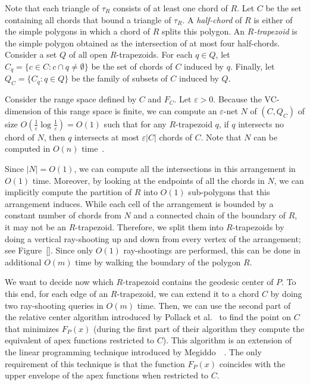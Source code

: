 \documentclass[a4paper,UKenglish]{lipics}
\newcommand{\F}[2]{\ensuremath{F_{\scriptscriptstyle #1}(#2)}}
\begin{document}
Note that each triangle of $\tau_R$ consists of at least one chord of $R$.
Let $C$ be the set containing all chords that bound a triangle of $\tau_R$. 
A \emph{half-chord} of $R$ is either of the simple polygons in which a chord of $R$ splits this polygon.
An \emph{$R$-trapezoid} is the simple polygon obtained as the intersection of at most four half-chords.
Consider a set $Q$ of all open $R$-trapezoids. 
For each $q\in Q$, let $C_q = \{c\in C: c\cap q \neq \emptyset\}$ be the set of chords of $C$ induced by $q$. 
Finally, let $Q_C = \{C_q : q\in Q\}$ be the family of subsets of $C$ induced by $Q$.

Consider the range space defined by $C$ and $F_C$. 
Let $\varepsilon >0$.
Because the VC-dimension of this range space is finite, we can compute an $\varepsilon$-net $N$ of $(C, Q_C)$ of size $O(\frac{1}{\varepsilon} \log \frac{1}{\varepsilon}) = O(1)$ such that for any $R$-trapezoid $q$, if $q$ intersects no chord of $N$, then $q$ intersects at most $\varepsilon |C|$ chords of $C$. Note that $N$ can be computed in $O(n)$ time~\cite{ConstructionEpsilonNets}. 

Since $|N| = O(1)$, we can compute all the intersections in this arrangement in $O(1)$ time. 
Moreover, by looking at the endpoints of all the chords in $N$, 
we can implicitly compute the partition of $R$ into $O(1)$ sub-polygons that this arrangement induces.
While each cell of the arrangement is bounded by a constant number of chords from $N$ and a connected chain of the boundary of $R$, it may not be an $R$-trapezoid. Therefore, we split them into $R$-trapezoids by doing a vertical ray-shooting up and down from every vertex of the arrangement; see Figure~\ref{}. 
Since only $O(1)$ ray-shootings are performed, this can be done in additional $O(m)$ time by walking the boundary of the polygon $R$.

We want to decide now which $R$-trapezoid contains the geodesic center of $P$. 
To this end, for each edge of an $R$-trapezoid, we can extend it to a chord $C$ by doing two ray-shooting queries in $O(m)$ time. Then, we can use the second part of the relative center algorithm introduced by Pollack et al.~\cite[Section~3]{pollackComputingCenter} to find the point on $C$ that minimizes $\F{P}{x}$ (during the first part of their algorithm they compute the equivalent of apex functions restricted to $C$).
This algorithm is an extension of the linear programming technique introduced by Megiddo~~\cite{megiddo1982linear}. 
The only requirement of this technique is that the function $\F{P}{x}$ coincides with the upper envelope of the apex functions when restricted to $C$.
\end{document}
